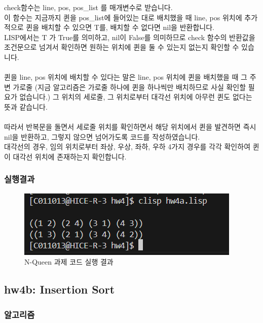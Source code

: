\documentclass{article}
\begin{document}
\quad check함수는 line, pos, pos\_list 를 매개변수로 받습니다.\\
이 함수는 지금까지 퀸을 pos\_list에 들어있는 대로 배치했을 때 line, pos 위치에 추가적으로 퀸을 배치할 수 있으면 T를, 배치할 수 없다면 nil을 반환합니다.\\
LISP에서는 T 가 True를 의미하고, nil이 False를 의미하므로 check 함수의 반환값을 조건문으로 넘겨서 확인하면 원하는 위치에 퀸을 둘 수 있는지 없는지 확인할 수 있습니다.\\\\
퀸을 line, pos 위치에 배치할 수 있다는 말은 line, pos 위치에 퀸을 배치했을 때 그 주변 가로줄 (지금 알고리즘은 가로줄 하나에 퀸을 하나씩만 배치하므로 사실 확인할 필요가 없습니다.) 그 위치의 세로줄, 그 위치로부터 대각선 위치에 아무런 퀸도 없다는 뜻과 같습니다.\\\\
따라서 반복문을 돌면서 세로줄 위치를 확인하면서 해당 위치에서 퀸을 발견하면 즉시 nil을 반환하고, 그렇지 않으면 넘어가도록 코드를 작성하였습니다.\\
대각선의 경우, 임의 위치로부터 좌상, 우상, 좌하, 우하 4가지 경우를 각각 확인하여 퀸이 대각선 위치에 존재하는지 확인합니다.

\subsubsection{실행결과}
\begin{figure}[!htb]
    \centering
    \includegraphics[width=0.5\linewidth]{hw4_img2.png}
    \caption{N-Queen 과제 코드 실행 결과}
    \label{fig-2}
\end{figure}

\subsection{hw4b: Insertion Sort}
\subsubsection{알고리즘}
\end{document}
